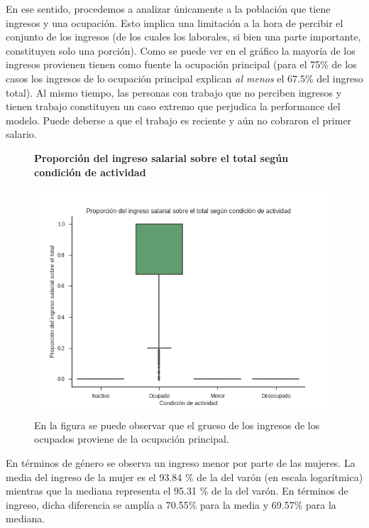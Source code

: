 En ese sentido, procedemos a analizar únicamente a la población que tiene ingresos y una ocupación. Esto implica una limitación a la hora de percibir el conjunto de los ingresos (de los cuales los laborales, si bien una parte importante, constituyen solo una porción). Como se puede ver en el gráfico la mayoría de los ingresos provienen tienen como fuente la ocupación principal (para el 75\% de los casos los ingresos de lo ocupación principal explican \textit{al menos} el 67.5\% del ingreso total). Al mismo tiempo, las personas con trabajo que no perciben ingresos y tienen trabajo constituyen un caso extremo que perjudica la performance del modelo. Puede deberse a que el trabajo es reciente y aún no cobraron el primer salario.

\begin{figure}[!htb]
	\centering
	\textbf{Proporción del ingreso salarial sobre el total según condición de actividad}\par\medskip
	\includegraphics[scale = 0.5]{../img/capitulo3/ingresoSalarialVtotal.png}
	\caption{En la figura se puede observar que el grueso de los ingresos de los ocupados proviene de la ocupación principal.}
\end{figure}

En términos de género se observa un ingreso menor por parte de las mujeres. La media del ingreso de la mujer es el 93.84 \% de la del varón (en escala logarítmica) mientras que la mediana representa el 95.31 \% de la del varón. En términos de ingreso, dicha diferencia se amplía a 70.55\% para la media y 69.57\% para la mediana. 


